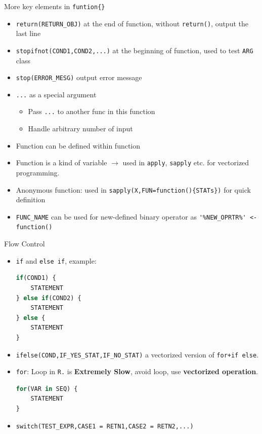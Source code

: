 More key elements in \lstinline|funtion{}|
\begin{itemize}[topsep=2pt,itemsep=0pt]
    \item \lstinline|return(RETURN_OBJ)| at the end of function, without \lstinline|return()|, output the last line
    \item \lstinline|stopifnot(COND1,COND2,...)| at the beginning of function, used to test \lstinline|ARG| class
    \item \lstinline|stop(ERROR_MESG)| output error message
    \item \lstinline|...| as a special argument
    \begin{itemize}[topsep=2pt,itemsep=0pt]
        \item Pass \lstinline|...| to another func in this function
        \item Handle arbitrary number of input
    \end{itemize}
    \item Function can be defined within function
    \item Function is a kind of variable $ \longrightarrow $ used in \lstinline|apply|, \lstinline|sapply| etc. for vectorized programming.
    \item Anonymous function: used in \lstinline|sapply(X,FUN=function(){STATs})| for quick definition
    \item \lstinline|FUNC_NAME| can be used for new-defined binary operator as \lstinline|'%NEW_OPRTR%' <- function()|
\end{itemize}


\begin{point}
    Flow Control
\end{point}

\begin{itemize}[topsep=2pt,itemsep=0pt]
    \item \lstinline|if| and \lstinline|else if|, example:
\begin{lstlisting}[language=R]
if(COND1) {
    STATEMENT
} else if(COND2) {
    STATEMENT
} else {
    STATEMENT
}
\end{lstlisting}
    \item \lstinline|ifelse(COND,IF_YES_STAT,IF_NO_STAT)| a vectorized version of \lstinline|for+if else|.

    \item \lstinline|for|: Loop in \lstinline|R.| is \textbf{Extremely Slow}, avoid loop, use \textbf{vectorized operation}.  
\begin{lstlisting}[language=R]
for(VAR in SEQ) {
    STATEMENT
}
\end{lstlisting}
    \item \lstinline|switch(TEST_EXPR,CASE1 = RETN1,CASE2 = RETN2,...)|
 
    
        
    

\end{itemize}







